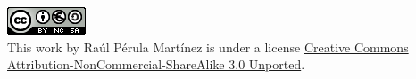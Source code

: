 \documentclass[a4paper,11pt]{article}
\begin{document}
	\vspace{1cm}
	\begin{center}
	
		\includegraphics[scale=0.8]{img/cc.png}\\
		This work by Raúl Pérula Martínez is under a license \href{http://creativecommons.org/licenses/by-nc-sa/3.0/}{Creative Commons Attribution-NonCommercial-ShareAlike 3.0 Unported}.

	\end{center}
	
\end{document}

